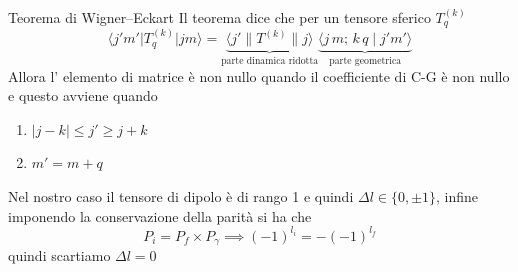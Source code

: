 \documentclass[11pt,a4paper]{article}
\theoremstyle{springer}
\theoremstyle{definition}
\theoremstyle{remark}
\begin{document}
\begin{deepbox}{Teorema di Wigner--Eckart}
Il teorema dice che per un tensore sferico $T_q^{(k)}$
\begin{equation*}
\langle j' m' \rvert T_q^{(k)} \lvert j m \rangle
=
\underbrace{\langle j' \rVert T^{(k)} \lVert j \rangle}_{\text{parte dinamica ridotta}}
\underbrace{\langle j\, m;\, k\, q \mid j' m' \rangle}_{\text{parte geometrica}}
\end{equation*}
Allora l' elemento di matrice è non nullo quando il coefficiente di C-G è non nullo e questo avviene quando 
\begin{enumerate}
  \item $|j-k| \leq j' \geq j+k $
  \item $m' = m+q$
\end{enumerate}
Nel nostro caso il tensore di dipolo è di rango 1 e quindi $\Delta l \in\{0,\pm1\}$, infine imponendo la conservazione della parità si ha che 
\begin{equation*}
  P_i = P_f \times P_\gamma \implies (-1)^{l_i} = -(-1)^{l_f}
\end{equation*}
quindi scartiamo $\Delta l = 0$
\end{deepbox}
\end{document}
